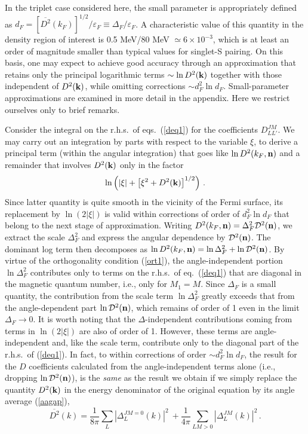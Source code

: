 In the triplet case considered here, the small parameter is appropriately
defined as $d_F=[{\overline{D^2}}(k_F)]^{1/2}/ \varepsilon_F \equiv 
\Delta_F/\varepsilon_F$.  A characteristic value of this quantity in 
the density region of interest is 0.5 MeV/80 MeV $\simeq 6 \times 10^{-3}$, 
which is at least an order of magnitude smaller than typical values 
for singlet-S pairing.  On this basis, one may expect to achieve 
good accuracy through an approximation that retains only the 
principal logarithmic terms $\sim \ln D^2({\bf k})$ together with 
those independent of $D^2({\bf k})$, while omitting corrections 
$\sim d^2_F\ln d_F$. Small-parameter approximations are examined 
in more detail in the appendix.  Here we restrict ourselves only 
to brief remarks.

Consider the integral on the r.h.s.\ of eqs.~(\ref{deq1}) for the 
coefficients $D_{LL'}^{JM}$.  We may carry out an integration 
by parts with respect to the variable $\xi$, to derive a 
principal term (within the angular integration) that goes 
like $\ln D^2(k_F,{\bf n})$ and a remainder that involves 
$D^2({\bf k})$ only in the factor 
$$
\ln\left(|\xi| +\left[\xi^2+D^2({\bf k})\right]^{1/2}\right) \,.
$$
Since latter quantity is quite smooth in the vicinity of
the Fermi surface, its replacement by $\ln (2|\xi|)$ is valid
within corrections of order of $d_F^2\ln d_F$ that belong to
the next stage of approximation.  Writing $D^2(k_F,{\bf n})=
\Delta^2_F{\cal D}^2({\bf n})$, we extract the scale $\Delta_F^2$
and express the angular dependence by ${\cal D}^2({\bf n})$.
The dominant log term then decomposes as $\ln D^2(k_F,{\bf n})=
\ln \Delta^2_F+\ln {\cal D}^2({\bf n})$.  By virtue of the
orthogonality condition (\ref{ort1}), the angle-independent
portion $\ln \Delta^2_F$ contributes only to terms on the r.h.s.\
of eq.~(\ref{deq1}) that are diagonal in the magnetic quantum number,
i.e., only for $M_1=M$.  Since $\Delta_F$ is a small quantity, the
contribution from the scale term $\ln \Delta^2_F$ greatly exceeds that
from the angle-dependent part $\ln {\cal D}^2({\bf n})$, which
remains of order of 1 even in the limit $\Delta_F\rightarrow 0$.   It
is worth noting that the $\Delta$-independent contributions coming
from terms in $\ln (2|\xi|)$ are also of order of 1.  However, these
terms are angle-independent and, like the scale term, contribute
only to the diagonal part of the r.h.s.\ of (\ref{deq1}).  In fact,
to within corrections of order $\sim d^2_F\ln d_F$, the result for
the $D$ coefficients calculated from the angle-independent terms
alone (i.e., dropping $\ln {\cal D}^2({\bf n})$), is the {\it same} 
as the result we obtain if we simply replace the quantity $D^2({\bf k})$ 
in the energy denominator of the original equation by its angle 
average (\ref{aagap}), 
\begin{equation}
{\overline{D^2}}(k) =
\frac1{8\pi} \sum_L |\Delta^{JM=0}_L(k)|^2 ~ +
\frac1{4\pi} \sum_{LM>0} |\Delta^{JM}_L(k)|^2 \, .
\label{avgap}
\end{equation}

